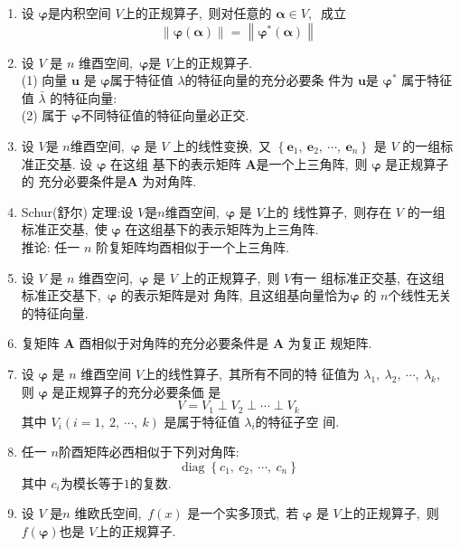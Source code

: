 \begin{enumerate}
		\item 设  $\boldsymbol{\varphi}$是内积空间 $ V  $上的正规算子,\  则对任意的 $ \boldsymbol{\alpha}\in V ,\ $ 成立
		$$\|\boldsymbol{\varphi}(\boldsymbol{\alpha})\|=\left\|\boldsymbol{\varphi}^{*}(\boldsymbol{\alpha})\right\|$$
		\item 设  $V$  是 $ n $ 维酉空间,\ $ \boldsymbol{\varphi}  $是  $V  $上的正规算子.\\
		(1) 向量  $\boldsymbol{u}$  是 $ \boldsymbol{\varphi}  $属于特征值  $\lambda  $的特征向量的充分必要条 件为 $ \boldsymbol{u}  $是 $ \boldsymbol{\varphi}^{*}$  属于特征值 $ \bar{\lambda} $ 的特征向量:\\
		(2) 属于 $ \boldsymbol{\varphi} $不同特征值的特征向量必正交.
		\item 设  $V  $是  $n  $维酉空间,\   $\boldsymbol{\varphi} $ 是  $V $ 上的线性变换,\  又  $\left\{\boldsymbol{e}_{1},\  \boldsymbol{e}_{2},\  \cdots,\  \boldsymbol{e}_{n}\right\}$  是  $V $ 的一组标准正交基. 设  $\boldsymbol{\varphi}$ 在这组 基下的表示矩阵  $\boldsymbol{A} $是一个上三角阵,\  则  $\boldsymbol{\varphi}$  是正规算子的 充分必要条件是$  \boldsymbol{A}$ 为对角阵.
		\item Schur(舒尔) 定理:设 $ V  $是$  n  $维酉空间,\ $ \boldsymbol{\varphi} $ 是  $V  $上的 线性算子,\  则存在 $ V $ 的一组标准正交基,\  使 $ \boldsymbol{\varphi} $ 在这组基下的表示矩阵为上三角阵.\\
		推论: 任一  $n $ 阶复矩阵均酉相似于一个上三角阵.
		\item 设  $V$  是  $n $ 维酉空问,\  $ \boldsymbol{\varphi}$  是 $ V $ 上的正规算子,\  则  $V  $有一 组标准正交基,\  在这组标准正交基下,\  $ \boldsymbol{\varphi}$ 的表示矩阵是对 角阵,\  且这组基向量恰为$ \boldsymbol{\varphi} $ 的  $n  $个线性无关的特征向量.
		\item 复矩阵 $ \boldsymbol{A}$  酉相似于对角阵的充分必要条件是  $\boldsymbol{A}$  为复正 规矩阵.
		\item 设 $\boldsymbol{\varphi}  $ 是 $ n$  维酉空间  $V  $上的线性算子,\  其所有不同的特 征值为 $ \lambda_{1},\  \lambda_{2},\  \cdots,\  \lambda_{k} ,\  $则  $\boldsymbol{\varphi} $ 是正规算子的充分必要条価 是
		$$V=V_{1} \perp V_{2} \perp \cdots \perp V_{k}$$
		其中  $V_{i}(i=1,\ 2,\  \cdots,\  k) $ 是属于特征值 $ \lambda_{i}  $的特征子空 间.
		\item 任一  $n  $阶酉矩阵必西相似于下列对角阵:
		$$\operatorname{diag}\left\{c_{1},\  c_{2},\  \cdots,\  c_{n}\right\}$$
		其中 $ c_{i}  $为模长等于$ 1 $的复数.
		\item 设  $V$  是$  n $ 维欧氏空间,\   $f(x)$  是一个实多顶式,\  若 $ \boldsymbol{\varphi}  $ 是  $V  $上的正规算子,\  则  $f(\boldsymbol{\varphi})  $也是 $ V  $上的正规算子.

\end{enumerate}

